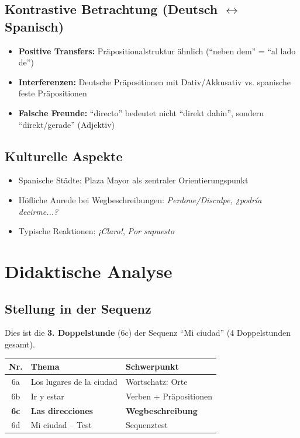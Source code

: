 \documentclass[11pt,a4paper]{article}
\newcommand{\reihenthema}{Mi ciudad}
\begin{document}
\subsection{Kontrastive Betrachtung (Deutsch $\leftrightarrow$ Spanisch)}
\begin{itemize}
    \item \textbf{Positive Transfers:} Präpositionalstruktur ähnlich (``neben dem'' = ``al lado de'')
    \item \textbf{Interferenzen:} Deutsche Präpositionen mit Dativ/Akkusativ vs. spanische feste Präpositionen
    \item \textbf{Falsche Freunde:} ``directo'' bedeutet nicht ``direkt dahin'', sondern ``direkt/gerade'' (Adjektiv)
\end{itemize}

\subsection{Kulturelle Aspekte}
\begin{itemize}
    \item Spanische Städte: Plaza Mayor als zentraler Orientierungspunkt
    \item Höfliche Anrede bei Wegbeschreibungen: \textit{Perdone/Disculpe, ¿podría decirme...?}
    \item Typische Reaktionen: \textit{¡Claro!}, \textit{Por supuesto}
\end{itemize}

\section{Didaktische Analyse}

\subsection{Stellung in der Sequenz}
Dies ist die \textbf{3. Doppelstunde} (6c) der Sequenz ``\reihenthema'' (4 Doppelstunden gesamt).

\begin{tabular}{|c|l|l|}
\hline
\textbf{Nr.} & \textbf{Thema} & \textbf{Schwerpunkt} \\
\hline
6a & Los lugares de la ciudad & Wortschatz: Orte \\
\hline
6b & Ir y estar & Verben + Präpositionen \\
\hline
\textbf{6c} & \textbf{Las direcciones} & \textbf{Wegbeschreibung} \\
\hline
6d & Mi ciudad -- Test & Sequenztest \\
\hline
\end{tabular}
\end{document}
